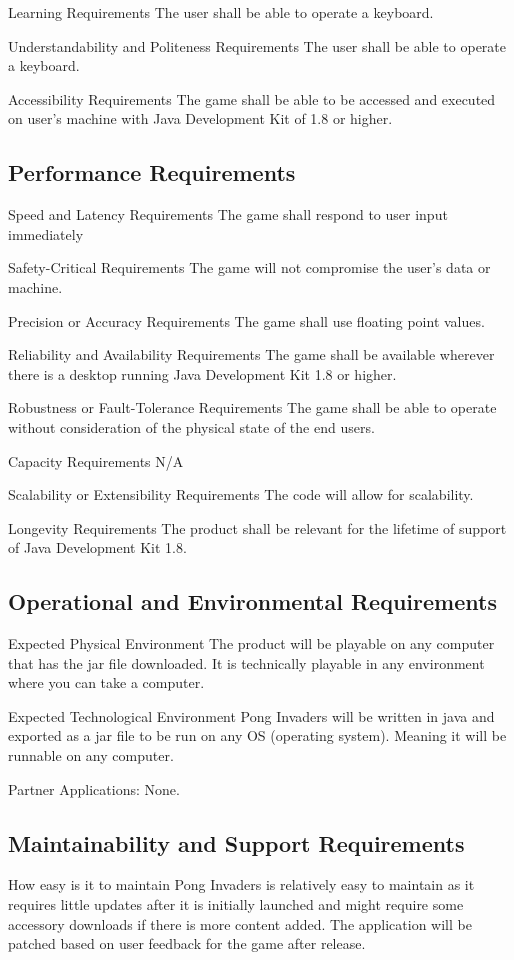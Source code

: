 \documentclass[12pt, titlepage]{article}
\begin{document}
Learning Requirements 
The user shall be able to operate a keyboard.

Understandability and Politeness Requirements
The user shall be able to operate a keyboard.

Accessibility Requirements 
The game shall be able to be accessed and executed on user’s machine with Java Development Kit of 1.8 or higher. 

\subsection{Performance Requirements}
Speed and Latency Requirements 
The game shall respond to user input immediately

Safety-Critical Requirements 
The game will not compromise the user’s data or machine. 

Precision or Accuracy Requirements 
The game shall use floating point values. 

Reliability and Availability Requirements
The game shall be available wherever there is a desktop running Java Development Kit 1.8 or higher.

Robustness or Fault-Tolerance Requirements 
The game shall be able to operate without consideration of the physical state of the end users.

Capacity Requirements 
N/A

Scalability or Extensibility Requirements 
The code will allow for scalability.

Longevity Requirements 
The product shall be relevant for the lifetime of support of Java Development Kit 1.8.


\subsection{Operational and Environmental Requirements}
Expected Physical Environment
The product will be playable on any computer that has the jar file downloaded. It is technically playable in any environment where you can take a computer.
 
Expected Technological Environment
Pong Invaders will be written in java and exported as a jar file to be run on any OS (operating system). Meaning it will be runnable on any computer.

Partner Applications:
None.


\subsection{Maintainability and Support Requirements}
How easy is it to maintain
Pong Invaders is relatively easy to maintain as it requires little updates after it is initially launched and might require some accessory downloads if there is more content added. The application will be patched based on user feedback for the game after release.
 
\end{document}
